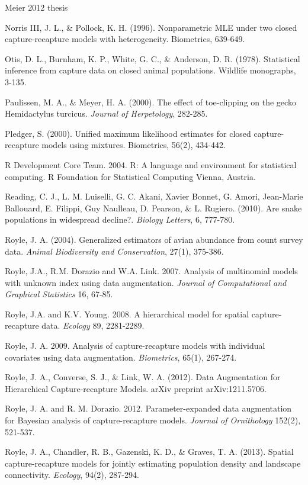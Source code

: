 \documentclass{book}
\begin{document}
\rf Meier 2012 thesis

\rf Norris III, J. L., \& Pollock, K. H. (1996). Nonparametric MLE under two closed capture-recapture models with heterogeneity. Biometrics, 639-649.

\rf Otis, D. L., Burnham, K. P., White, G. C., \& Anderson, D. R. (1978). Statistical inference from capture data on closed animal populations. Wildlife monographs, 3-135.

\rf Paulissen, M. A., \& Meyer, H. A. (2000). The effect of toe-clipping on the gecko Hemidactylus turcicus. \textit{Journal of Herpetology}, 282-285.

\rf Pledger, S. (2000). Unified maximum likelihood estimates for closed capture-recapture models using mixtures. Biometrics, 56(2), 434-442.

\rf R Development Core Team. 2004. R: A language and environment for statistical computing. R Foundation for Statistical Computing Vienna, Austria.

\rf Reading, C. J., L. M. Luiselli, G. C. Akani, Xavier Bonnet, G. Amori, Jean-Marie Ballouard, E. Filippi, Guy Naulleau, D. Pearson, \& L. Rugiero. (2010). Are snake populations in widespread decline?. \textit{Biology Letters}, 6, 777-780.

\rf Royle, J. A. (2004). Generalized estimators of avian abundance from count survey data. \textit{Animal Biodiversity and Conservation}, 27(1), 375-386.

\rf Royle, J.A., R.M. Dorazio and W.A. Link. 2007. Analysis of multinomial models with unknown index using data augmentation. {\it Journal of Computational and Graphical Statistics}  16, 67-85.

\rf  Royle, J.A. and K.V. Young. 2008. A hierarchical model for spatial capture-recapture data. {\it Ecology}  89, 2281-2289.

\rf Royle, J. A. 2009. Analysis of capture-recapture models with individual covariates using data augmentation. {\it Biometrics}, 65(1), 267-274.

\rf Royle, J. A., Converse, S. J., \& Link, W. A. (2012). Data Augmentation for Hierarchical Capture-recapture Models. arXiv preprint arXiv:1211.5706.

\rf Royle, J. A. and R. M. Dorazio. 2012. Parameter-expanded data augmentation for Bayesian analysis of capture-recapture models. {\it Journal of Ornithology} 152(2), 521-537.

\rf Royle, J. A., Chandler, R. B., Gazenski, K. D., \& Graves, T. A. (2013). Spatial capture-recapture models for jointly estimating population density and landscape connectivity. \textit{Ecology}, 94(2), 287-294.
\end{document}
